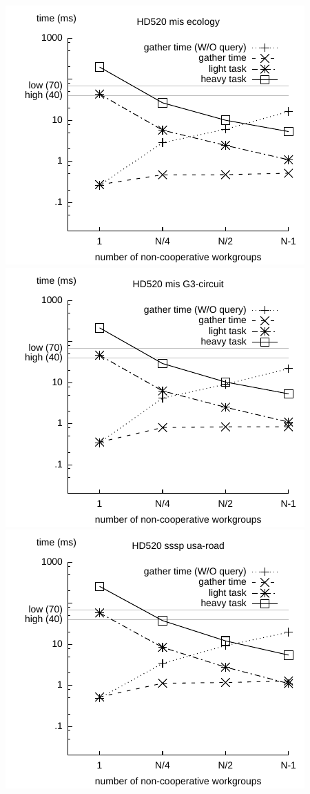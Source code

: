 \documentclass[sigconf]{acmart}
\begin{document}
{\includegraphics[width=.7\columnwidth]{images/barrier/hd520_mis_ecology.pdf} \\
\includegraphics[width=.7\columnwidth]{images/barrier/hd520_mis_G3_circuit.pdf} \\
\includegraphics[width=.7\columnwidth]{images/barrier/hd520_sssp_usa_road.pdf} \\
}
\end{document}
